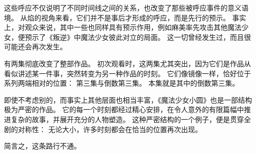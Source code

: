 这些呼应不仅说明了不同时间线之间的关系，也改变了那些被呼应事件的意义语境。
从焰的视角来看，它们并不是事后才形成的呼应，而是先行的预示。
事实上，对观众来说，其中一些也同样具有预示作用，例如麻美率先攻击其他魔法少女，便预示了《叛逆》中魔法少女彼此对立的局面。
这一切曾经发生过，而且很可能还会再次发生。

有两集彻底改变了整部作品。
初次观看时，这两集尤其突出，因为它们是作品从看似讲述某一件事，突然转变为另一种作品的时刻。
它们像镜像一样，恰好位于系列两端相对的位置：
第三集与倒数第三集。
本集就是其中的倒数第三集。

即使不考虑别的，而事实上其他层面也相当丰富，《魔法少女小圆》也是一部结构极为严密的作品。
它的每一个时刻都经过精心安排，在令人意外的有限篇幅中推进复杂的故事，并展开充分的人物塑造。
这种严密结构的一个例子，便是贯穿全剧的对称性：
无论大小，许多时刻都会在恰当的位置再次出现。

简言之，这条路行不通。
